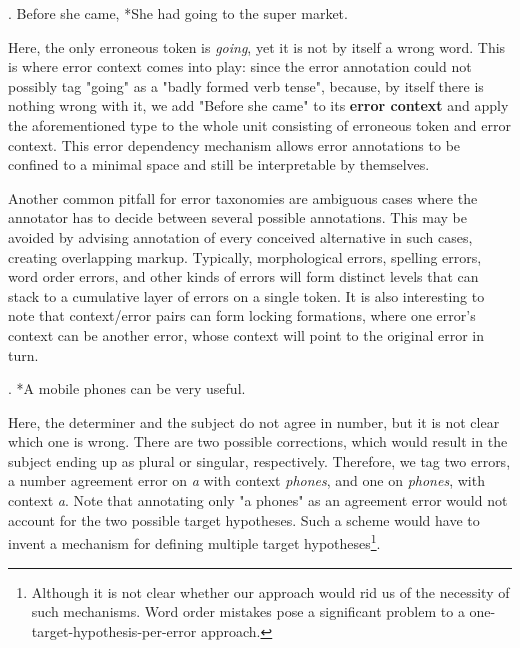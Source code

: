 \documentclass{article}
\begin{document}
\ex. Before she came, *She had going to the super market.

Here, the only erroneous token is \textit{going}, yet it is not by itself a
wrong word. This is where error context comes into play: since the error
annotation could not possibly tag "going" as a "badly formed verb tense", because, by
itself there is nothing wrong with it, we add "Before she came" to its
\textbf{error context} and apply the aforementioned type to the whole unit
consisting of erroneous token and error context. This error dependency mechanism
allows error annotations to be confined to a minimal space and still be
interpretable by themselves.

Another common pitfall for error taxonomies are ambiguous cases where the
annotator has to decide between several possible annotations. This may be
avoided by advising annotation of every conceived alternative in such cases,
creating overlapping markup. Typically, morphological errors, spelling errors,
word order errors, and other kinds of errors will form distinct levels that can
stack to a cumulative layer of errors on a single token. It is also interesting
to note that context/error pairs can form locking formations, where one error's
context can be another error, whose context will point to the original error in
turn.

\ex. *A mobile phones can be very useful.

Here, the determiner and the subject do not agree in number, but it is not clear
which one is wrong. There are two possible corrections, which would result
in the subject ending up as plural or singular, respectively. Therefore, we tag
two errors, a number agreement error on \textit{a} with context \textit{phones}, and
one on \textit{phones}, with context \textit{a}. Note that annotating only "a
phones" as an agreement error would not account for the two possible target
hypotheses. Such a scheme would have to invent a mechanism for defining multiple
target hypotheses\footnote{Although it is not clear whether our approach would
rid us of the necessity of such mechanisms. Word order mistakes pose a
significant problem to a one-target-hypothesis-per-error approach.}.

\end{document}
